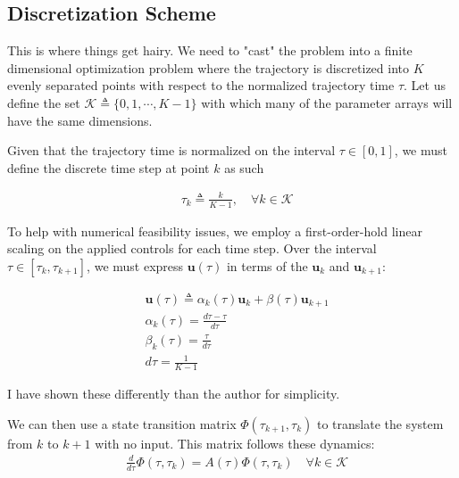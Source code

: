 \subsection{Discretization Scheme}
This is where things get hairy. We need to "cast" the problem into a finite dimensional optimization problem where the trajectory is discretized into $K$ evenly separated points with respect to the normalized trajectory time $\tau$. Let us define the set $\mathcal{K}\triangleq \{0,1,\cdots, K-1\}$ with which many of the parameter arrays will have the same dimensions.

Given that the trajectory time is normalized on the interval $\tau \in [0,1 ]$, we must define the discrete time step at point $k$ as such

\begin{align}
& \tau_k \triangleq \frac{k}{K-1}, \quad \forall k \in \mathcal{K}
\end{align}

To help with numerical feasibility issues, we employ a first-order-hold linear scaling on the applied controls for each time step. Over the interval $\tau \in [\tau_k, \tau_{k+1}]$, we must express $\mathbf{u}(\tau)$ in terms of the $\mathbf{u}_k$
 and $\mathbf{u}_{k+1}$:

 \begin{align}
& \mathbf{u}(\tau) \triangleq \alpha_k(\tau) \mathbf{u}_k + \beta(\tau) \mathbf{u}_{k+1} \\ 
& \alpha_k(\tau) = \frac{d\tau - \tau}{d\tau} \\
& \beta_k(\tau) = \frac{\tau}{d\tau} \\
& d\tau = \frac{1}{K-1}
\end{align}

I have shown these differently than the author for simplicity.

We can then use a state transition matrix $\Phi(\tau_{k+1},\tau_k)$ to translate the system from $k$ to $k+1$ with no input. This matrix follows these dynamics:
\begin{align}
& \frac{d}{d\tau} \Phi(\tau,\tau_k) = A(\tau) \Phi(\tau,\tau_k) \quad \forall k \in \mathcal{K}
\end{align}

